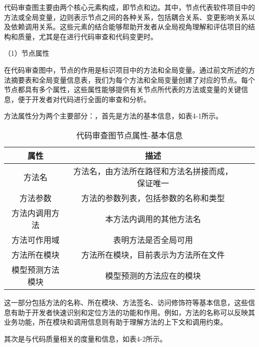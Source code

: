代码审查图主要由两个核心元素构成，即节点和边。其中，节点代表软件项目中的方法或全局变量，边则表示节点之间的各种关系，包括耦合关系、变更影响关系以及依赖调用关系。这些元素的结合能够帮助开发者从全局视角理解和评估项目的结构和质量，尤其是在进行代码审查和代码变更时。

（1）节点属性

在代码审查图中，节点的作用是标识项目中的方法和全局变量。通过前文所述的方法摘要表和全局变量信息表，我们为每个方法和全局变量创建了对应的节点。每个节点都具有多个属性，这些属性能够提供有关节点所代表的方法或变量的关键信息，便于开发者对代码进行全面的审查和分析。

方法属性分为两个主要部分：，首先是方法的基本信息，如表4-1所示。

\begin{table}[htbp]
\caption{代码审查图节点属性-基本信息}
\vspace{0.5em}\centering\wuhao
\begin{tabular}{cccc}
\toprule
    属性 & 描述 \\
\midrule
方法名 & 方法名，由方法所在路径和方法名拼接而成，保证唯一  \\
方法参数 & 方法的参数列表，包括参数的名称和类型   \\
方法内调用方法 & 本方法内调用的其他方法名   \\
方法可作用域 & 表明方法是否全局可用   \\
方法所在模块 &  方法所在模块，目前表示为方法所在文件  \\
模型预测方法模块 & 模型预测的方法应在的模块   \\     
\bottomrule
\end{tabular}
\end{table}

这一部分包括方法的名称、所在模块、方法签名、访问修饰符等基本信息，这些信息有助于开发者快速识别和定位方法的功能和作用。例如，方法的名称可以反映其业务功能，所在模块和调用信息则有助于理解方法的上下文和调用约束。

其次是与代码质量相关的度量和信息，如表4-2所示。

